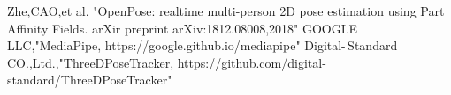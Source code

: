 \vspace{-4.0mm}
\begin{thebibliography}{}
\vspace{-1.5mm}
\scriptsize{
Zhe,CAO,et al. "OpenPose: realtime multi-person
                2D pose estimation using Part Affinity Fields. arXir preprint
                arXiv:1812.08008,2018"
GOOGLE LLC,"MediaPipe,
https://google.github.io/mediapipe"
Digital-\,Standard\,CO.,Ltd.,"ThreeDPoseTracker,
https://github.com/digital-standard/ThreeDPoseTracker"
}
\end{thebibliography}
